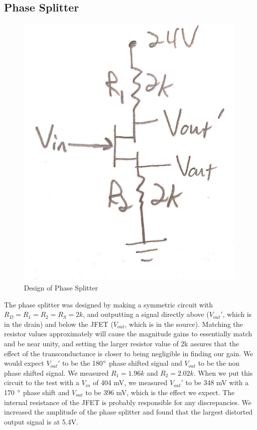 \documentclass{article}
\begin{document}
\subsection{Phase Splitter}
    \begin{figure}[H]
        \centering
        \includegraphics[scale = 0.15]{IMG2.JPG}
        \caption{Design of Phase Splitter}
        \label{fig:my_label}
    \end{figure}
    The phase splitter was designed by making a symmetric circuit with $R_D = R_1 = R_2 = R_S = 2k$, and outputting a signal directly above ($V_{out}'$, which is in the drain) and below the JFET ($V_{out}$, which is in the source). Matching the resistor values approximately will cause the magnitude gains to essentially match and be near unity, and setting the larger resistor value of 2k assures that the effect of the transconductance is closer to being negligible in finding our gain. We would expect $V_{out}'$ to be the 180$\degree$ phase shifted signal and $V_{out}$ to be the non phase shifted signal. We measured $R_1 = 1.96k$ and $R_2 = 2.02k$. When we put this circuit to the test with a $V_{in}$ of 404 mV, we measured $V_{out}'$ to be 348 mV with a 170 $\degree$ phase shift and $V_{out}$ to be 396 mV, which is the effect we expect. The internal resistance of the JFET is probably responsible for any discrepancies. We increased the amplitude of the phase splitter and found that the largest distorted output signal is at 5.4V.
\end{document}
